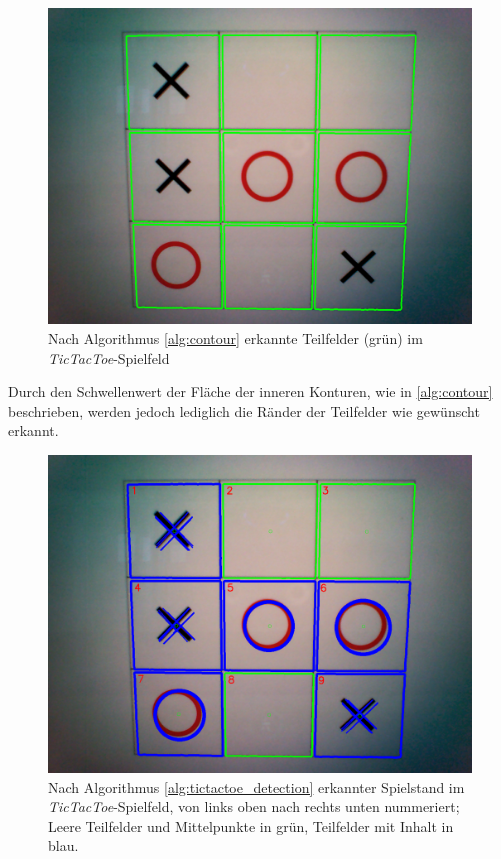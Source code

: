\begin{figure}[!htbp]
    \centering
    \includegraphics[width=12cm]{bilder/tictactoe_contours.png}
    \caption[\textit{TicTacToe} Konturen]{Nach Algorithmus \vref{alg:contour} erkannte Teilfelder (grün) im \textit{TicTacToe}-Spielfeld}
    \label{fig:tictactoe_contours}
\end{figure}
\noindent
Durch den Schwellenwert der Fläche der inneren Konturen, wie in \vref{alg:contour} beschrieben, werden jedoch lediglich die Ränder der Teilfelder wie gewünscht erkannt.\\

\begin{figure}[!htbp]
    \centering
    \includegraphics[width=12cm]{bilder/tictactoe_result.png}
    \caption[Ausgewertetes \textit{TicTacToe}-Spielfeld]{Nach Algorithmus \vref{alg:tictactoe_detection} erkannter Spielstand im \textit{TicTacToe}-Spielfeld, von links oben nach rechts unten nummeriert; Leere Teilfelder und Mittelpunkte in grün, Teilfelder mit Inhalt in blau.}
    \label{fig:tictactoe_result}
\end{figure}

